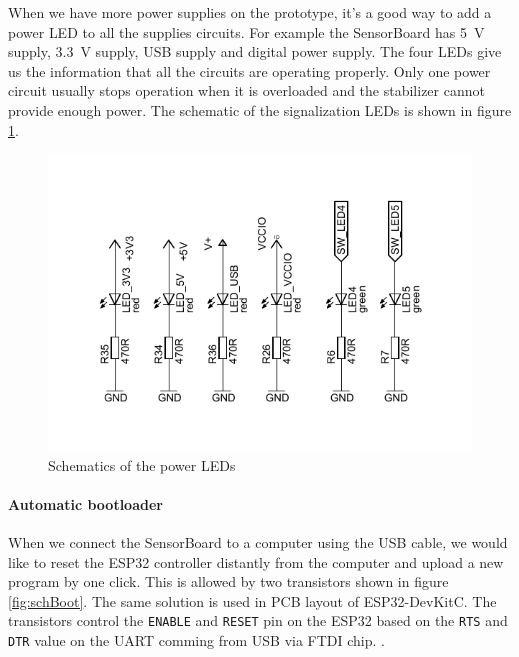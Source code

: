 When we have more power supplies on the prototype, it's a good way to add a power \ac{LED} to all the supplies circuits. For example the SensorBoard has \SI{5}{V} supply, \SI{3.3}{V} supply, USB supply and digital power supply. The four \ac{LED}s give us the information that all the circuits are operating properly. Only one power circuit usually stops operation when it is overloaded and the stabilizer cannot provide enough power. The schematic of the signalization \ac{LED}s is shown in figure \ref{fig:schLeds}.

\begin{figure}
    \centering
    \label{fig:schLeds}
    \caption{Schematics of the power LEDs}
    \includegraphics[scale=1.3]{img/SchLeds.pdf}
\end{figure}

\paragraph{Automatic bootloader}

When we connect the SensorBoard to a computer using the \ac{USB} cable, we would like to reset the ESP32 controller distantly from the computer and upload a new program by one click. This is allowed by two transistors shown in figure \ref{fig:schBoot}. The same solution is used in \ac{PCB} layout of ESP32-DevKitC. \cite{espressif:ESP32DevKitC} The transistors control the \texttt{ENABLE} and \texttt{RESET} pin on the ESP32 based on the \texttt{RTS} and \texttt{DTR} value on the \ac{UART} comming from \ac{USB} via FTDI chip. \cite{ftdichip:FT232R}.

